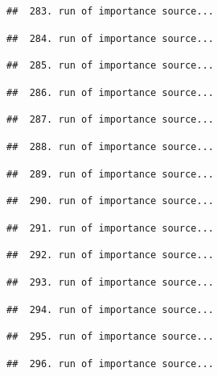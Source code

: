 \documentclass[
]{article}
\begin{document}
\begin{verbatim}
##  283. run of importance source...
\end{verbatim}

\begin{verbatim}
##  284. run of importance source...
\end{verbatim}

\begin{verbatim}
##  285. run of importance source...
\end{verbatim}

\begin{verbatim}
##  286. run of importance source...
\end{verbatim}

\begin{verbatim}
##  287. run of importance source...
\end{verbatim}

\begin{verbatim}
##  288. run of importance source...
\end{verbatim}

\begin{verbatim}
##  289. run of importance source...
\end{verbatim}

\begin{verbatim}
##  290. run of importance source...
\end{verbatim}

\begin{verbatim}
##  291. run of importance source...
\end{verbatim}

\begin{verbatim}
##  292. run of importance source...
\end{verbatim}

\begin{verbatim}
##  293. run of importance source...
\end{verbatim}

\begin{verbatim}
##  294. run of importance source...
\end{verbatim}

\begin{verbatim}
##  295. run of importance source...
\end{verbatim}

\begin{verbatim}
##  296. run of importance source...
\end{verbatim}
\end{document}
